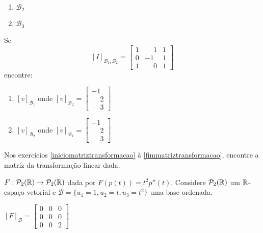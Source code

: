 \documentclass[12pt]{exam}
\begin{document}
\begin{exercicio}
\begin{enumerate}[label={\alph*})]
\begin{enumerate}[label={\roman*})]
            \item $\mathcal{B}_2$

            \item $\mathcal{B}_3$
        \end{enumerate}
    \end{enumerate}
\end{exercicio}

\begin{exercicio}
    Se
    \[
    [I]_{\mathcal{B}_1,\mathcal{B}_2} = \begin{bmatrix}
        1 & \phantom{-}1 & 1\\
        0 & -1 & 1\\
        1 & \phantom{-}0 & 1
    \end{bmatrix}
    \]
    encontre:
    \begin{enumerate}[label={\alph*})]
        \item $[v]_{\mathcal{B}_1}$ onde $[v]_{\mathcal{B}_2} = \begin{bmatrix}
            -1\\\phantom{-}2\\\phantom{-}3
        \end{bmatrix}$

        \item $[v]_{\mathcal{B}_2}$ onde $[v]_{\mathcal{B}_1} = \begin{bmatrix}
            -1\\\phantom{-}2\\\phantom{-}3
        \end{bmatrix}$
    \end{enumerate}
\end{exercicio}

    Nos exercícios \eqref{iniciomatriztransformacao} à \eqref{fimmatriztransformacao}, encontre a matriz da transformação linear dada.

\begin{exercicio}\label{iniciomatriztransformacao}
    $F : \mathcal{P}_2(\mathbb{R}) \to \mathcal{P}_2(\mathbb{R})$ dada por $F(p(t)) = t^2p''(t)$. Considere $\mathcal{P}_2(\mathbb{R})$ um $\mathbb{R}$-espaço vetorial e $\mathcal{B} = \{u_1 = 1, u_2 = t, u_3 = t^2\}$ uma base ordenada.

    \begin{solucao}
        $[F]_\mathcal{B} = \begin{bmatrix}
                0 & 0 & 0\\
                0 & 0 & 0\\
                0 & 0 & 2
            \end{bmatrix}$
      \end{solucao}
\end{exercicio}
\end{document}
